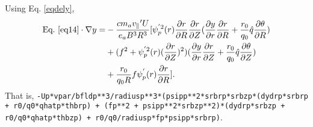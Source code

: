 \documentclass[12pt]{article}
\begin{document}
\begin{CJK*}{UTF8}{gbsn}
Using Eq. \ref{eqdely},
\begin{equation}
\begin{split}
    \textrm{Eq.}\ \ref{eq14} \cdot\nabla y =& -\frac{cm_av_{\parallel}{'}U}{e_aB^3R^3}[\psi_p^{'2}(r)\frac{\partial r}{\partial R}\frac{\partial r}{\partial Z}
    (\frac{\partial y}{\partial r}\frac{\partial r}{\partial R} + \frac{r_0}{q_0}\hat{q}\frac{\partial \theta}{\partial R})\\
    &+ (f^2 + \psi_p^{'2}(r)(\frac{\partial r}{\partial Z})^2)(\frac{\partial y}{\partial r}\frac{\partial r}{\partial Z} + 
    \frac{r_0}{q_0}\hat{q}\frac{\partial \theta}{\partial Z})\\
    &+ \frac{r_0}{q_0R}f\psi_p^{'}(r)\frac{\partial r}{\partial R}].
\end{split}
\end{equation}
That is, \texttt{-Up*vpar/bfldp**3/radiusp**3*(psipp**2*srbrp*srbzp*(dydrp*srbrp + r0/q0*qhatp*thbrp)
 + (fp**2 + psipp**2*srbzp**2)*(dydrp*srbzp + r0/q0*qhatp*thbzp) + r0/q0/radiusp*fp*psipp*srbrp)}.

\newpage

\end{CJK*}
\end{document}
